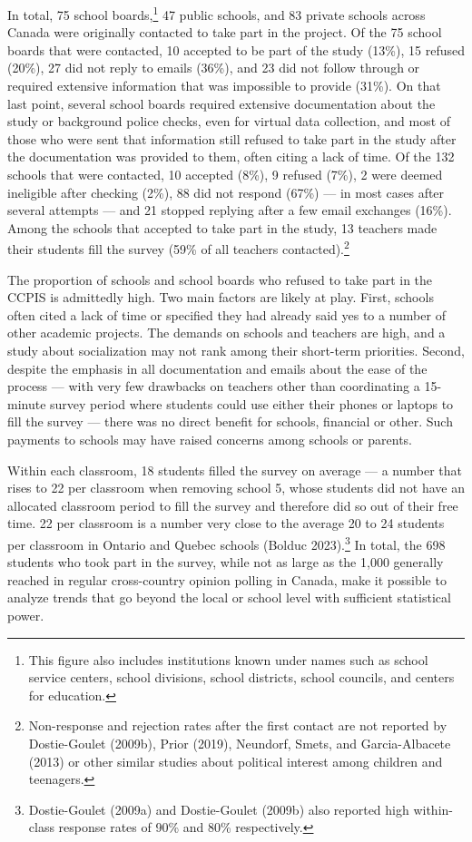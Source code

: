 \documentclass[
  letterpaper,
  DIV=11,
  numbers=noendperiod]{scrreprt}
\begin{document}
In total, 75 school boards,\footnote{This figure also includes
  institutions known under names such as school service centers, school
  divisions, school districts, school councils, and centers for
  education.} 47 public schools, and 83 private schools across Canada
were originally contacted to take part in the project. Of the 75 school
boards that were contacted, 10 accepted to be part of the study (13\%),
15 refused (20\%), 27 did not reply to emails (36\%), and 23 did not
follow through or required extensive information that was impossible to
provide (31\%). On that last point, several school boards required
extensive documentation about the study or background police checks,
even for virtual data collection, and most of those who were sent that
information still refused to take part in the study after the
documentation was provided to them, often citing a lack of time. Of the
132 schools that were contacted, 10 accepted (8\%), 9 refused (7\%), 2
were deemed ineligible after checking (2\%), 88 did not respond (67\%)
--- in most cases after several attempts --- and 21 stopped replying
after a few email exchanges (16\%). Among the schools that accepted to
take part in the study, 13 teachers made their students fill the survey
(59\% of all teachers contacted).\footnote{Non-response and rejection
  rates after the first contact are not reported by Dostie-Goulet
  (2009b), Prior (2019), Neundorf, Smets, and Garcia-Albacete (2013) or
  other similar studies about political interest among children and
  teenagers.}

The proportion of schools and school boards who refused to take part in
the CCPIS is admittedly high. Two main factors are likely at play.
First, schools often cited a lack of time or specified they had already
said yes to a number of other academic projects. The demands on schools
and teachers are high, and a study about socialization may not rank
among their short-term priorities. Second, despite the emphasis in all
documentation and emails about the ease of the process --- with very few
drawbacks on teachers other than coordinating a 15-minute survey period
where students could use either their phones or laptops to fill the
survey --- there was no direct benefit for schools, financial or other.
Such payments to schools may have raised concerns among schools or
parents.

Within each classroom, 18 students filled the survey on average --- a
number that rises to 22 per classroom when removing school 5, whose
students did not have an allocated classroom period to fill the survey
and therefore did so out of their free time. 22 per classroom is a
number very close to the average 20 to 24 students per classroom in
Ontario and Quebec schools (Bolduc 2023).\footnote{Dostie-Goulet (2009a)
  and Dostie-Goulet (2009b) also reported high within-class response
  rates of 90\% and 80\% respectively.} In total, the 698 students who
took part in the survey, while not as large as the 1,000 generally
reached in regular cross-country opinion polling in Canada, make it
possible to analyze trends that go beyond the local or school level with
sufficient statistical power.
\end{document}
